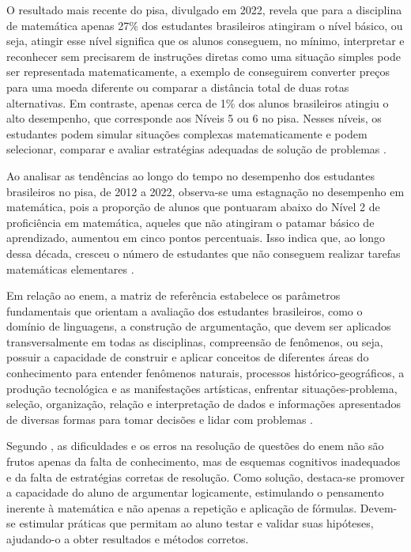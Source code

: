 O resultado mais recente do \gls{pisa}, divulgado em 2022, revela que para a
disciplina de matemática apenas 27\% dos estudantes brasileiros atingiram o
nível básico, ou seja, atingir esse nível significa que os alunos conseguem, no
mínimo, interpretar e reconhecer sem precisarem de instruções diretas como uma
situação simples pode ser representada matematicamente, a exemplo de conseguirem
converter preços para uma moeda diferente ou comparar a distância total de duas
rotas alternativas. Em contraste, apenas cerca de 1\% dos alunos brasileiros
atingiu o alto desempenho, que corresponde aos Níveis 5 ou 6 no \gls{pisa}. Nesses
níveis, os estudantes podem simular situações complexas matematicamente e podem
selecionar, comparar e avaliar estratégias adequadas de solução de problemas
\cite{brasil2026pisa}. 


Ao analisar as tendências ao longo do tempo no desempenho dos estudantes
brasileiros no \gls{pisa}, de 2012 a 2022, observa-se uma estagnação no desempenho em
matemática, pois a proporção de alunos que pontuaram abaixo do Nível 2 de
proficiência em matemática, aqueles que não atingiram o patamar básico de
aprendizado, aumentou em cinco pontos percentuais. Isso indica que, ao longo
dessa década, cresceu o número de estudantes que não conseguem realizar tarefas
matemáticas elementares \cite{brasil2026pisa}. 


Em relação ao \gls{enem}, a matriz de referência estabelece os parâmetros fundamentais
que orientam a avaliação dos estudantes brasileiros, como o domínio de
linguagens, a construção de argumentação, que devem ser aplicados
transversalmente em todas as disciplinas, compreensão de fenômenos, ou seja,
possuir a capacidade de construir e aplicar conceitos de diferentes áreas do
conhecimento para entender fenômenos naturais, processos histórico-geográficos,
a produção tecnológica e as manifestações artísticas, enfrentar
situações-problema, seleção, organização, relação e interpretação de dados e
informações apresentados de diversas formas para tomar decisões e lidar com
problemas \cite{matriz_enem}.


Segundo \cite{pontes2019questoes}, as dificuldades e os erros na resolução de
questões do \gls{enem} não são frutos apenas da falta de conhecimento, mas de esquemas
cognitivos inadequados e da falta de estratégias corretas de resolução. Como
solução, destaca-se promover a capacidade do aluno de argumentar logicamente,
estimulando o pensamento inerente à matemática e não apenas a repetição e
aplicação de fórmulas. Devem-se estimular práticas que permitam ao aluno testar
e validar suas hipóteses, ajudando-o a obter resultados e métodos corretos.


